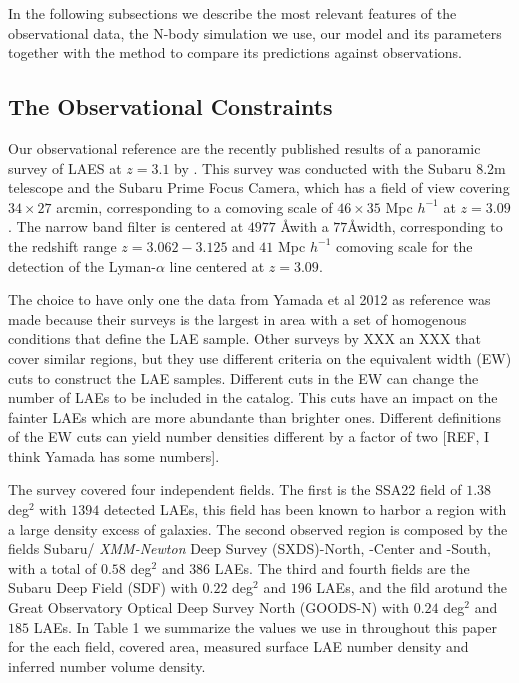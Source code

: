 \documentclass[usenatbib]{mn2e}
\begin{document}
In the following subsections we describe the most relevant features of
the observational data, the N-body simulation we use, our model and
its parameters together with the method to compare its predictions
against observations. 

\subsection{The Observational Constraints}

Our observational reference are the recently published results of a
panoramic survey of LAES at $z=3.1$ by \cite{Yamada2012}. This survey
was conducted with the Subaru 8.2m telescope and the Subaru Prime
Focus Camera, which has a field of view covering $34\times 27$ arcmin,
corresponding to a comoving scale of $46\times35$ Mpc $h^{-1}$ at
$z=3.09$. The narrow band filter is centered at $4977$ \AA with a
$77$\AA width, corresponding to the redshift range $z=3.062-3.125$ and
$41$ Mpc $h^{-1}$ comoving scale for the detection of the
Lyman-$\alpha$ line centered at $z=3.09$. 

The choice to have only one the data from Yamada et al 2012 as
reference was  made because their surveys is the largest in area with
a set of homogenous conditions that define the LAE sample. Other
surveys by XXX an XXX that cover similar regions, but they use
different criteria on the equivalent width (EW) cuts to construct the
LAE samples. Different cuts in the EW can change the number of LAEs to
be included in the catalog. This cuts have an impact on the fainter
LAEs which are more abundante than brighter ones. Different
definitions of the EW cuts can yield number densities different by a
factor of two [REF, I think Yamada has some numbers]. 
 

The survey covered four independent fields. The first is the SSA22
field of $1.38$ deg$^2$ with $1394$ detected LAEs, this field has been
known to harbor a region with a large density excess of galaxies. The
second observed region is composed by the fields Subaru/{\it
  XMM-Newton} Deep Survey (SXDS)-North, -Center and -South, with a 
total of $0.58$ deg$^2$ and $386$ LAEs. The third and fourth fields
are the Subaru Deep Field (SDF) with $0.22$ deg$^2$ and $196$ LAEs,
and the fild arotund the Great Observatory Optical Deep Survey North
(GOODS-N) with $0.24$ deg$^2$ and $185$ LAEs. In Table 1 we summarize
the values we use in throughout this paper for the each field, covered
area, measured surface LAE number density and inferred number volume
density. 
\end{document}
